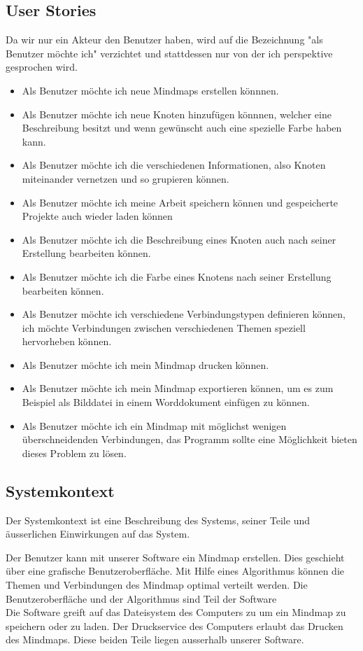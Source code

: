 \documentclass[a4paper,parskip]{scrartcl}
\begin{document}
\subsection{User Stories}
Da wir nur ein Akteur den Benutzer haben, wird auf die Bezeichnung "{}als Benutzer möchte ich"{} verzichtet und stattdessen nur von der ich perspektive gesprochen wird. 
\begin{itemize}
\item Als Benutzer möchte ich neue Mindmaps erstellen könnnen.
\item Als Benutzer möchte ich neue Knoten hinzufügen könnnen, welcher eine Beschreibung besitzt und wenn gewünscht auch eine spezielle Farbe haben kann. 
\item Als Benutzer möchte ich die verschiedenen Informationen, also Knoten miteinander vernetzen und so grupieren können. 
\item Als Benutzer möchte ich meine Arbeit speichern können und gespeicherte Projekte auch wieder laden können
\item Als Benutzer möchte ich die Beschreibung eines Knoten auch nach seiner Erstellung bearbeiten können.
\item Als Benutzer möchte ich die Farbe eines Knotens nach seiner Erstellung bearbeiten können.
\item Als Benutzer möchte ich verschiedene Verbindungstypen definieren können, ich möchte Verbindungen zwischen verschiedenen Themen speziell hervorheben können. 
\item Als Benutzer möchte ich mein Mindmap drucken können.
\item Als Benutzer möchte ich mein Mindmap exportieren können, um es zum Beispiel als Bilddatei in einem Worddokument einfügen zu können.
\item Als Benutzer möchte ich ein Mindmap mit möglichst wenigen überschneidenden Verbindungen, das Programm sollte eine Möglichkeit bieten dieses Problem zu lösen.

\end{itemize}

\subsection{Systemkontext}
Der Systemkontext ist eine Beschreibung des Systems, seiner Teile und äusserlichen Einwirkungen auf das System.

Der Benutzer kann mit unserer Software ein Mindmap erstellen. Dies geschieht über eine grafische Benutzeroberfläche. Mit Hilfe eines Algorithmus können die Themen und Verbindungen des Mindmap optimal verteilt werden. Die Benutzeroberfläche und der Algorithmus sind Teil der Software\\
Die Software greift auf das Dateisystem des Computers zu um ein Mindmap zu speichern oder zu laden. Der Druckservice des Computers erlaubt das Drucken des Mindmaps. Diese beiden Teile liegen ausserhalb unserer Software.
\end{document}
